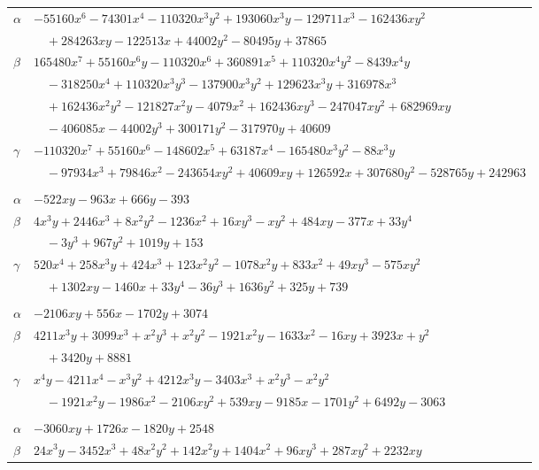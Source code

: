 \documentclass[11pt]{article}
\begin{document}
\begin{longtable}{@{}ll@{}}
$\alpha$ & $-55160x^{6}-74301x^{4}-110320x^{3}y^{2}+193060x^{3}y-129711x^{3}-162436xy^{2}$\\
 & $\quad +284263xy-122513x+44002y^{2}-80495y+37865$\\
$\beta$ & $165480x^{7}+55160x^{6}y-110320x^{6}+360891x^{5}+110320x^{4}y^{2}-8439x^{4}y$\\
 & $\quad -318250x^{4}+110320x^{3}y^{3}-137900x^{3}y^{2}+129623x^{3}y+316978x^{3}$\\
 & $\quad +162436x^{2}y^{2}-121827x^{2}y-4079x^{2}+162436xy^{3}-247047xy^{2}+682969xy$\\
 & $\quad -406085x-44002y^{3}+300171y^{2}-317970y+40609$\\
$\gamma$ & $-110320x^{7}+55160x^{6}-148602x^{5}+63187x^{4}-165480x^{3}y^{2}-88x^{3}y$\\
 & $\quad -97934x^{3}+79846x^{2}-243654xy^{2}+40609xy+126592x+307680y^{2}-528765y+242963$\\
\addlinespace[3pt]
\multicolumn{2}{@{}l}{$\{i,j\}=\{3,71\}$, $k_{ij}=2\cdot 3\cdot 7\cdot 13$}\\
$\alpha$ & $-522xy-963x+666y-393$\\
$\beta$ & $4x^{3}y+2446x^{3}+8x^{2}y^{2}-1236x^{2}+16xy^{3}-xy^{2}+484xy-377x+33y^{4}$\\
 & $\quad -3y^{3}+967y^{2}+1019y+153$\\
$\gamma$ & $520x^{4}+258x^{3}y+424x^{3}+123x^{2}y^{2}-1078x^{2}y+833x^{2}+49xy^{3}-575xy^{2}$\\
 & $\quad +1302xy-1460x+33y^{4}-36y^{3}+1636y^{2}+325y+739$\\
\addlinespace[3pt]
\multicolumn{2}{@{}l}{$\{i,j\}=\{3,75\}$, $k_{ij}=2^{3}\cdot 7^{3}$}\\
$\alpha$ & $-2106xy+556x-1702y+3074$\\
$\beta$ & $4211x^{3}y+3099x^{3}+x^{2}y^{3}+x^{2}y^{2}-1921x^{2}y-1633x^{2}-16xy+3923x+y^{2}$\\
 & $\quad +3420y+8881$\\
$\gamma$ & $x^{4}y-4211x^{4}-x^{3}y^{2}+4212x^{3}y-3403x^{3}+x^{2}y^{3}-x^{2}y^{2}$\\
 & $\quad -1921x^{2}y-1986x^{2}-2106xy^{2}+539xy-9185x-1701y^{2}+6492y-3063$\\
\addlinespace[3pt]
\multicolumn{2}{@{}l}{$\{i,j\}=\{3,76\}$, $k_{ij}=2^{4}\cdot 7\cdot 13$}\\
$\alpha$ & $-3060xy+1726x-1820y+2548$\\
$\beta$ & $24x^{3}y-3452x^{3}+48x^{2}y^{2}+142x^{2}y+1404x^{2}+96xy^{3}+287xy^{2}+2232xy$\\

\end{longtable}
\end{document}
